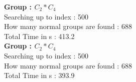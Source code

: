 \textbf{Group : $C_2*C_4$}\\
Searching up to index : 500\\
How many normal groups are found : 688\\
Total Time in s : 413.2\\
\textbf{Group : $C_2*C_4$}\\
Searching up to index : 500\\
How many normal groups are found : 688\\
Total Time in s : 393.9\\
